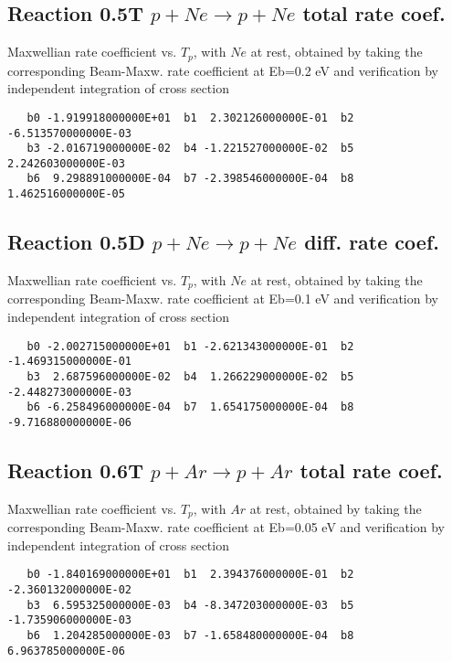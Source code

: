 \documentclass[12pt,dvipdfmx]{article}
\begin{document}
\subsection{
Reaction 0.5T  $p + Ne \rightarrow p + Ne$ total rate coef.
}
Maxwellian rate coefficient vs. $T_{p}$, with $Ne$ at rest, obtained by taking
the corresponding Beam-Maxw. rate coefficient at Eb=0.2 eV and
verification by independent integration of cross section
\begin{small}\begin{verbatim}
   b0 -1.919918000000E+01  b1  2.302126000000E-01  b2 -6.513570000000E-03
   b3 -2.016719000000E-02  b4 -1.221527000000E-02  b5  2.242603000000E-03
   b6  9.298891000000E-04  b7 -2.398546000000E-04  b8  1.462516000000E-05
\end{verbatim}\end{small}


\subsection{
Reaction 0.5D  $p + Ne \rightarrow p + Ne$ diff. rate coef.
}
Maxwellian rate coefficient vs. $T_{p}$, with $Ne$ at rest, obtained by taking
the corresponding Beam-Maxw. rate coefficient at Eb=0.1 eV and
verification by independent integration of cross section
\begin{small}\begin{verbatim}
   b0 -2.002715000000E+01  b1 -2.621343000000E-01  b2 -1.469315000000E-01
   b3  2.687596000000E-02  b4  1.266229000000E-02  b5 -2.448273000000E-03
   b6 -6.258496000000E-04  b7  1.654175000000E-04  b8 -9.716880000000E-06
\end{verbatim}\end{small}

\subsection{
Reaction 0.6T  $p + Ar \rightarrow p + Ar$ total rate coef.
}
Maxwellian rate coefficient vs. $T_{p}$, with $Ar$ at rest, obtained by taking
the corresponding Beam-Maxw. rate coefficient at Eb=0.05 eV and
verification by independent integration of cross section
\begin{small}\begin{verbatim}
   b0 -1.840169000000E+01  b1  2.394376000000E-01  b2 -2.360132000000E-02
   b3  6.595325000000E-03  b4 -8.347203000000E-03  b5 -1.735906000000E-03
   b6  1.204285000000E-03  b7 -1.658480000000E-04  b8  6.963785000000E-06
\end{verbatim}\end{small}
\end{document}
